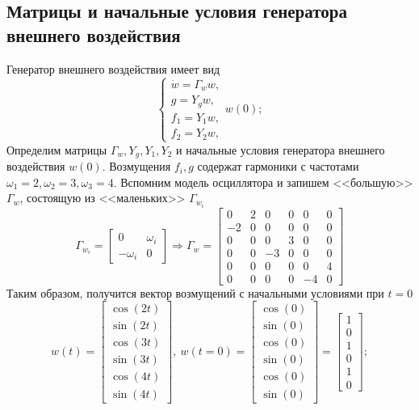 \documentclass[a4paper, 12pt]{article}
\begin{document}
    \subsection{Матрицы и начальные условия генератора внешнего воздействия}
    Генератор внешнего воздействия имеет вид
    $$  
    \begin{cases}
        \dot{w}=\Gamma_w w,\\
        g=Y_g w,\\
        f_1=Y_1 w,\\
        f_2=Y_2 w,
    \end{cases} w(0);
    $$
    Определим матрицы $\Gamma_w,Y_g,Y_1,Y_2$ и начальные условия генератора внешнего воздействия $w(0)$.
    Возмущения $f_i,g$ содержат гармоники с частотами $\omega_1=2,\omega_2=3,\omega_3=4$. Вспомним модель осциллятора
    и запишем <<большую>> $\Gamma_w$, состоящую из <<маленьких>> $\Gamma_{w_i}$
    $$
    \Gamma_{w_i}=\begin{bmatrix}
        0 &\omega_i\\
        -\omega_i &0
    \end{bmatrix}\Rightarrow \Gamma_w=\begin{bmatrix}
        0 &2 &0 &0 &0 &0\\
        -2 &0 &0 &0 &0 &0\\
        0 &0 &0 &3 &0 &0\\
        0 &0 &-3 &0 &0 &0\\
        0 &0 &0 &0 &0 &4\\
        0 &0 &0 &0 &-4 &0
    \end{bmatrix}
    $$
    Таким образом, получится вектор возмущений с начальными условиями при $t=0$
    $$
    w(t)=\begin{bmatrix}
        \cos\left( 2t \right)\\
        \sin\left( 2t \right)\\
        \cos\left( 3t \right)\\
        \sin\left( 3t \right)\\
        \cos\left( 4t \right)\\
        \sin\left( 4t \right)
    \end{bmatrix},\
    w(t=0)=\begin{bmatrix}
        \cos\left( 0 \right)\\
        \sin\left( 0 \right)\\
        \cos\left( 0 \right)\\
        \sin\left( 0 \right)\\
        \cos\left( 0 \right)\\
        \sin\left( 0 \right)
    \end{bmatrix}=\begin{bmatrix}
        1\\
        0\\
        1\\
        0\\
        1\\
        0
    \end{bmatrix};
    $$
\end{document}
